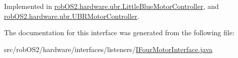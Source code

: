 Implemented in \hyperlink{classrob_o_s2_1_1hardware_1_1ubr_1_1_little_blue_motor_controller_aafeb3c0f1e4f568fdd33ef6c0c3c201b}{robOS2.hardware.ubr.LittleBlueMotorController}, and \hyperlink{classrob_o_s2_1_1hardware_1_1ubr_1_1_u_b_r_motor_controller_a241ca402b048c4d674b1daa159ff2452}{robOS2.hardware.ubr.UBRMotorController}.



The documentation for this interface was generated from the following file:\begin{DoxyCompactItemize}
\item 
src/robOS2/hardware/interfaces/listeners/\hyperlink{_i_four_motor_interface_8java}{IFourMotorInterface.java}\end{DoxyCompactItemize}
